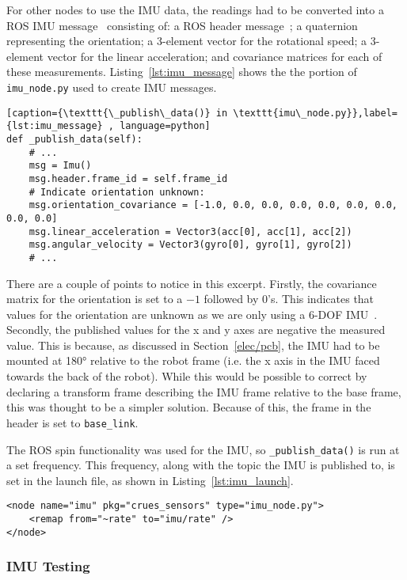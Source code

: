 For other nodes to use the IMU data, the readings had to be converted into
a ROS IMU message~\cite[sensor\_msgs/Imu.msg]{ROSDocs} consisting of: a ROS header message~\cite[std\_msgs/Header.msg]{ROSDocs};
a quaternion representing the orientation; a 3-element vector for
the rotational speed; a 3-element vector for the linear
acceleration; and covariance matrices for each of these measurements.
Listing~\ref{lst:imu_message} shows the the portion of \verb|imu_node.py| used to create IMU messages.


\begin{lstlisting}[caption={\texttt{\_publish\_data()} in \texttt{imu\_node.py}},label={lst:imu_message} , language=python]
def _publish_data(self):
    # ...
    msg = Imu()
    msg.header.frame_id = self.frame_id
    # Indicate orientation unknown:
    msg.orientation_covariance = [-1.0, 0.0, 0.0, 0.0, 0.0, 0.0, 0.0, 0.0, 0.0]
    msg.linear_acceleration = Vector3(acc[0], acc[1], acc[2])
    msg.angular_velocity = Vector3(gyro[0], gyro[1], gyro[2])
    # ...
\end{lstlisting}

There are a couple of points to notice in this excerpt. Firstly, the
covariance matrix for the orientation is set to a $-1$ followed by 0's.
This indicates that values for the orientation are unknown as we are only
using a 6-DOF IMU~\cite[sensor\_msgs/Imu.msg]{ROSDocs}. Secondly, the published values for the
x and y axes are negative the measured value. This is because, as
discussed in Section~\ref{elec/pcb}, the IMU had to be mounted at
\ang{180} relative to the robot frame (i.e. the x axis in the IMU faced
towards the back of the robot). While this would be possible to correct by
declaring a transform frame describing the IMU frame relative to the base
frame, this was thought to be a simpler solution. Because of this, the
frame in the header is set to \verb|base_link|.

The ROS spin functionality was used for the IMU, so
\verb|_publish_data()| is run at a set
frequency. This frequency, along with the topic the
IMU is published to, is set in the launch file, as
shown in Listing~\ref{lst:imu_launch}.

\begin{lstlisting}[caption={IMU node in ROS launch file}, label={lst:imu_launch}, style=xml]
<node name="imu" pkg="crues_sensors" type="imu_node.py">
    <remap from="~rate" to="imu/rate" />
</node>
\end{lstlisting}

\subsubsection{IMU Testing}\label{soft/odometry/imu/test}

